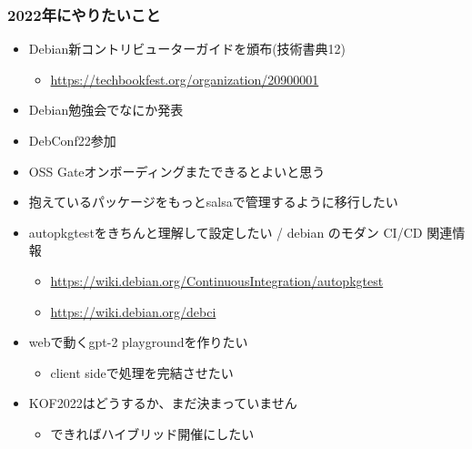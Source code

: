 \documentclass[mingoth,a4paper]{jsarticle}
\begin{document}
\subsubsection{2022年にやりたいこと}


\begin{itemize}
\item Debian新コントリビューターガイドを頒布(技術書典12)
  \begin{itemize}
  \item \url{https://techbookfest.org/organization/20900001}
  \end{itemize}
\item Debian勉強会でなにか発表
\item DebConf22参加
\item OSS Gateオンボーディングまたできるとよいと思う
\end{itemize}


\begin{itemize}
\item 抱えているパッケージをもっとsalsaで管理するように移行したい
\item autopkgtestをきちんと理解して設定したい / debian のモダン CI/CD 関連情報
  \begin{itemize}
  \item \url{https://wiki.debian.org/ContinuousIntegration/autopkgtest}
  \item \url{https://wiki.debian.org/debci}
  \end{itemize}
\item webで動くgpt-2 playgroundを作りたい
  \begin{itemize}
  \item client sideで処理を完結させたい
  \end{itemize}
\end{itemize}


\begin{itemize}
\item KOF2022はどうするか、まだ決まっていません
  \begin{itemize}
  \item できればハイブリッド開催にしたい
  \end{itemize}
\end{itemize}

\end{document}
